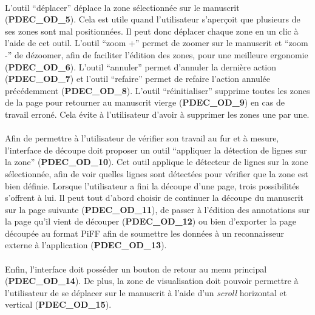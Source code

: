 \paragraph{}
L’outil “déplacer” déplace la zone sélectionnée sur le manuscrit
(\textbf{PDEC\_OD\_5}). Cela est utile quand l’utilisateur s’aperçoit que
plusieurs de ses zones sont mal positionnées. Il peut donc déplacer chaque zone
en un clic à l’aide de cet outil. L’outil “zoom +” permet de zoomer sur le
manuscrit et “zoom -” de dézoomer, afin de faciliter l’édition des zones, pour
une meilleure ergonomie (\textbf{PDEC\_OD\_6}). L’outil “annuler” permet
d’annuler la dernière action (\textbf{PDEC\_OD\_7}) et l’outil “refaire” permet
de refaire l’action annulée précédemment (\textbf{PDEC\_OD\_8}). L’outil
“réinitialiser” supprime toutes les zones de la page pour retourner au
manuscrit vierge (\textbf{PDEC\_OD\_9}) en cas de travail erroné. Cela évite à
l’utilisateur d’avoir à supprimer les zones une par une.

\paragraph{}
Afin de permettre à l’utilisateur de vérifier son travail au fur et à mesure,
l’interface de découpe doit proposer un outil “appliquer la détection de
lignes sur la zone” (\textbf{PDEC\_OD\_10}). Cet outil applique le détecteur de
lignes sur la zone sélectionnée, afin de voir quelles lignes sont détectées
pour vérifier que la zone est bien définie. Lorsque l’utilisateur a fini la
découpe d’une page, trois possibilités s’offrent à lui. Il peut tout d’abord
choisir de continuer la découpe du manuscrit sur la page suivante
(\textbf{PDEC\_OD\_11}), de passer à l’édition des annotations sur la page qu’il
vient de découper (\textbf{PDEC\_OD\_12}) ou bien d’exporter la page découpée au
format PiFF afin de soumettre les données à un reconnaisseur externe à
l’application (\textbf{PDEC\_OD\_13}).

\paragraph{}
Enfin, l’interface doit posséder un bouton de retour au menu principal
(\textbf{PDEC\_OD\_14}). De plus, la zone de visualisation doit pouvoir permettre
à l’utilisateur de se déplacer sur le manuscrit à l’aide d’un \textit{scroll} horizontal
et vertical (\textbf{PDEC\_OD\_15}).

\newpage

